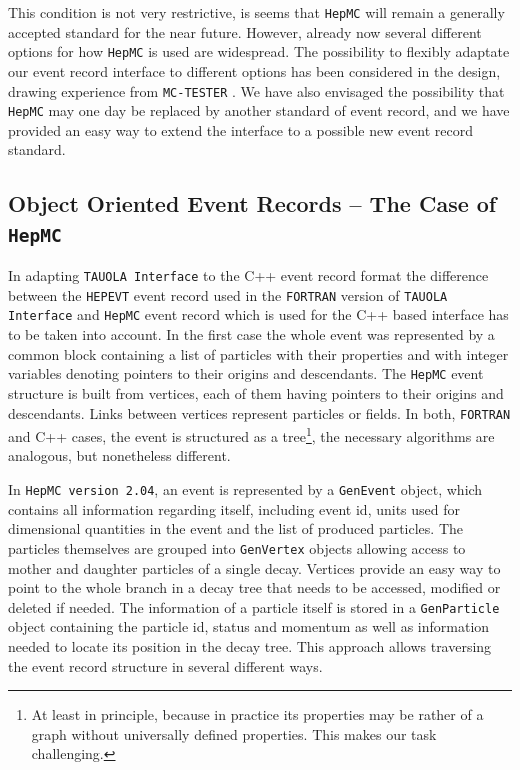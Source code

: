 \documentclass[]{Tauola_interface_design}
\begin{document}
This condition is not very restrictive, is seems that {\tt HepMC} will
remain a generally accepted standard for the near future. However,
already now several different options for how {\tt HepMC} is used are
widespread. The possibility to flexibly adaptate our event record 
interface to different
options has been considered in the design,  drawing experience
from {\tt MC-TESTER} \cite{Golonka:2002rz,Davidson:2008ma}. 
We have also
envisaged the possibility that {\tt HepMC} may one day be replaced by another
standard of event record, and we have provided an easy way to extend
the interface to a possible new event record standard.

\subsection{Object Oriented Event Records  -- The Case of {\tt HepMC}}
In adapting {\tt TAUOLA Interface} to the C++ event record format
 the difference between the {\tt HEPEVT} event record used in the {\tt FORTRAN}
version of {\tt TAUOLA Interface} and  {\tt HepMC} event record  
which is used for the C++ based interface
has to be taken into account. 
In the first case the whole event was represented
by a common block containing a list of particles with their properties and
with integer 
variables denoting pointers to their origins and descendants.
 The {\tt HepMC} event structure
is built from vertices, each of them having pointers to their origins and descendants. Links between vertices represent particles or fields.
 In both, {\tt FORTRAN} and C++  
cases, the event is structured as 
a tree\footnote{At least in principle, because in practice its properties
may be rather of a graph without universally defined properties.
This makes our task challenging.}, the necessary algorithms are  analogous, 
but nonetheless different.

In {\tt HepMC version 2.04}, an  event is represented by a {\tt GenEvent} object,
which contains all information regarding itself, including event id,
units used for dimensional quantities in the event and the list of produced particles. The particles
themselves are grouped into {\tt GenVertex} objects allowing access to mother
and daughter particles of a single decay. Vertices provide an easy way
to point to the whole branch in a decay tree that needs to be accessed,
modified or deleted if needed. The information of a particle  itself is stored
in a {\tt GenParticle} object containing the particle id, status and momentum
as well as information needed to locate its position in the decay tree.
This approach allows traversing the event record structure in several different
ways.
\end{document}
